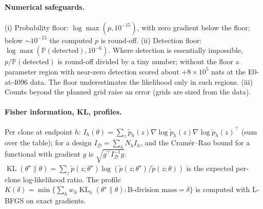 \documentclass[11pt]{article}
\theoremstyle{definition}
\theoremstyle{remark}
\newcommand{\Prob}{\mathbb{P}}
\DeclareMathOperator{\KL}{KL}
\begin{document}
\paragraph{Numerical safeguards.} (i) Probability floor: $\log\max(p,10^{-15})$, with zero gradient below the floor; below $\sim10^{-15}$ the computed $p$ is round-off. (ii) Detection floor: $\log\max(\Prob(\text{detected}),10^{-6})$. Where detection is essentially impossible, $p/\Prob(\text{detected})$ is round-off divided by a tiny number; without the floor a parameter region with near-zero detection scored about $+8\times10^5$ nats at the E0-at-4096 data. The floor underestimates the likelihood only in such regions. (iii) Counts beyond the planned grid raise an error (grids are sized from the data).

\paragraph{Fisher information, KL, profiles.} Per clone at endpoint $h$: $I_h(\theta)=\sum_z\tilde p_h(z)\nabla\log\tilde p_h(z)\nabla\log\tilde p_h(z)^\top$ (sum over the table); for a design $I_{\mathcal D}=\sum_hN_hI_h$, and the Cram\'er--Rao bound for a functional with gradient $g$ is $\sqrt{g^\top I_{\mathcal D}^{-1}g}$. $\KL(\theta^\star\|\theta)=\sum_z\tilde p(z;\theta^\star)\log(\tilde p(z;\theta^\star)/\tilde p(z;\theta))$ is the expected per-clone log-likelihood ratio. The profile $K(\delta)=\min\{\sum_hw_h\KL_h(\theta^\star\|\theta):\text{B-division mass}=\delta\}$ is computed with L-BFGS on exact gradients.

\end{document}
